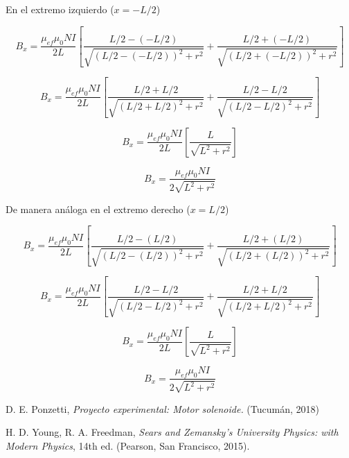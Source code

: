 \documentclass[a4paper,12pt]{article}
\begin{document}
    En el extremo izquierdo ($x=-L/2$)

    \begin{equation*}
        B_x = \frac{\mu_{ef}\mu_0 N I}{2L} \left[ \frac{L/2 - (-L/2)}{\sqrt{(L/2 - (-L/2))^2 + r^2}} + \frac{L/2 + (-L/2)}{\sqrt{(L/2 + (-L/2))^2 + r^2}} \right]
    \end{equation*}

    \begin{equation*}
        B_x = \frac{\mu_{ef}\mu_0 N I}{2L} \left[ \frac{L/2 + L/2}{\sqrt{(L/2 + L/2)^2 + r^2}} + \frac{L/2 - L/2}{\sqrt{(L/2 - L/2)^2 + r^2}} \right]
    \end{equation*}

    \begin{equation*}
        B_x = \frac{\mu_{ef}\mu_0 N I}{2L} \left[ \frac{L}{\sqrt{L^2 + r^2}} \right]
    \end{equation*}

    \begin{equation*}
        B_x = \frac{\mu_{ef}\mu_0 N I}{2\sqrt{L^2 + r^2}}
    \end{equation*}

De manera análoga en el extremo derecho ($x=L/2$)

    \begin{equation*}
        B_x = \frac{\mu_{ef}\mu_0 N I}{2L} \left[ \frac{L/2 - (L/2)}{\sqrt{(L/2 - (L/2))^2 + r^2}} + \frac{L/2 + (L/2)}{\sqrt{(L/2 + (L/2))^2 + r^2}} \right]
    \end{equation*}

    \begin{equation*}
        B_x = \frac{\mu_{ef}\mu_0 N I}{2L} \left[ \frac{L/2 - L/2}{\sqrt{(L/2 - L/2)^2 + r^2}} + \frac{L/2 + L/2}{\sqrt{(L/2 + L/2)^2 + r^2}} \right]
    \end{equation*}

    \begin{equation*}
        B_x = \frac{\mu_{ef}\mu_0 N I}{2L} \left[ \frac{L}{\sqrt{L^2 + r^2}} \right]
    \end{equation*}
    
    \begin{equation*}
        B_x = \frac{\mu_{ef}\mu_0 N I}{2\sqrt{L^2 + r^2}}
    \end{equation*}

\begin{thebibliography}{99}

    \bibitem{} D. E. Ponzetti, \emph{Proyecto experimental: Motor solenoide.} (Tucumán, 2018)

    \bibitem{} H. D. Young, R. A. Freedman, \emph{Sears and Zemansky's University Physics: with Modern Physics}, 14th ed. (Pearson, San Francisco, 2015).

\end{thebibliography}
\end{document}
